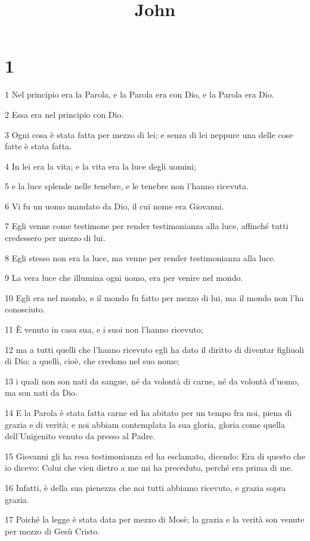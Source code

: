 

\title{John}


\chapter{1}

\par 1 Nel principio era la Parola, e la Parola era con Dio, e la Parola era Dio.
\par 2 Essa era nel principio con Dio.
\par 3 Ogni cosa è stata fatta per mezzo di lei; e senza di lei neppure una delle cose fatte è stata fatta.
\par 4 In lei era la vita; e la vita era la luce degli uomini;
\par 5 e la luce splende nelle tenebre, e le tenebre non l'hanno ricevuta.
\par 6 Vi fu un uomo mandato da Dio, il cui nome era Giovanni.
\par 7 Egli venne come testimone per render testimonianza alla luce, affinché tutti credessero per mezzo di lui.
\par 8 Egli stesso non era la luce, ma venne per render testimonianza alla luce.
\par 9 La vera luce che illumina ogni uomo, era per venire nel mondo.
\par 10 Egli era nel mondo, e il mondo fu fatto per mezzo di lui, ma il mondo non l'ha conosciuto.
\par 11 È venuto in casa sua, e i suoi non l'hanno ricevuto;
\par 12 ma a tutti quelli che l'hanno ricevuto egli ha dato il diritto di diventar figliuoli di Dio; a quelli, cioè, che credono nel suo nome;
\par 13 i quali non son nati da sangue, né da volontà di carne, né da volontà d'uomo, ma son nati da Dio.
\par 14 E la Parola è stata fatta carne ed ha abitato per un tempo fra noi, piena di grazia e di verità; e noi abbiam contemplata la sua gloria, gloria come quella dell'Unigenito venuto da presso al Padre.
\par 15 Giovanni gli ha resa testimonianza ed ha esclamato, dicendo: Era di questo che io dicevo: Colui che vien dietro a me mi ha preceduto, perché era prima di me.
\par 16 Infatti, è della sua pienezza che noi tutti abbiamo ricevuto, e grazia sopra grazia.
\par 17 Poiché la legge è stata data per mezzo di Mosè; la grazia e la verità son venute per mezzo di Gesù Cristo.
